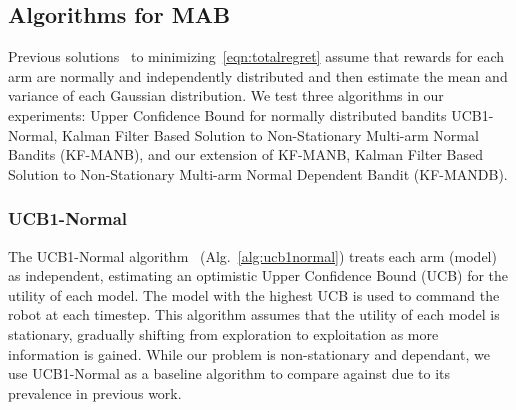 \subsection{Algorithms for MAB}
\label{sec:bandit_algorithms}

Previous solutions~\cite{Auer2002,Granmo2010} to minimizing~\eqref{eqn:totalregret} assume that rewards for each arm are normally and independently distributed and then estimate the mean and variance of each Gaussian distribution.  We test three algorithms in our experiments: Upper Confidence Bound for normally distributed bandits UCB1-Normal, Kalman Filter Based Solution to Non-Stationary Multi-arm Normal Bandits (KF-MANB), and our extension of KF-MANB, Kalman Filter Based Solution to Non-Stationary Multi-arm Normal Dependent Bandit (KF-MANDB).



\subsubsection{UCB1-Normal}
The UCB1-Normal algorithm~\cite{Auer2002} (Alg.~\ref{alg:ucb1normal}) treats each arm (model) as independent, estimating an optimistic Upper Confidence Bound (UCB) for the utility of each model. The model with the highest UCB is used to command the robot at each timestep. This algorithm assumes that the utility of each model is stationary, gradually shifting from exploration to exploitation as more information is gained. While our problem is non-stationary and dependant, we use UCB1-Normal as a baseline algorithm to compare against due to its prevalence in previous work.

